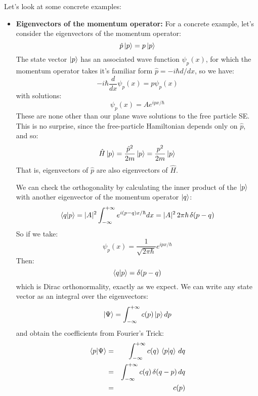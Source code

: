 \documentclass[12pt]{book}
\begin{document}
Let's look at some concrete examples:
\begin{itemize}
\item {\bf Eigenvectors of the momentum operator:}  For a concrete example, let's consider the eigenvectors of the momentum operator:
$$\hat{p} \ket{p} = p \ket{p}$$
The state vector $\ket{p}$ has an associated wave function $\psi_p(x)$, for which the momentum operator takes it's familiar form $\hat{p} = -i\hbar d/dx$, so we have:
$$-i\hbar \frac{d}{dx}\psi_p(x) = p \psi_p(x)$$
with solutions:
$$\psi_p(x) = A e^{\displaystyle ipx/\hbar}$$
These are none other than our plane wave solutions to the free particle SE.  This is no surprise, since the free-particle Hamiltonian depends only on $\hat{p}$, and so:
$$\hat{H} \ket{p} = \frac{\hat{p}^2}{2m} \ket{p} = \frac{p^2}{2m} \ket{p}$$
That is, eigenvectors of $\hat{p}$ are also eigenvectors of $\hat{H}$.

We can check the orthogonality by calculating the inner product of the $\ket{p}$ with another eigenvector of the momentum operator $\ket{q}$:
$$\braket{q|p} = |A|^2\int_{-\infty}^{+\infty} e^{i(p-q)x/\hbar} dx = |A|^2 \, 2\pi\hbar \, \delta(p-q)$$
So if we take:
$$\psi_p(x) = \frac{1}{\sqrt{2\pi \hbar}} e^{\displaystyle ipx/\hbar}$$
Then:
$$\braket{q|p} = \delta(p-q)$$
which is Dirac orthonormality, exactly as we expect.  We can write any state vector as an integral over the eigenvectors:
$$\ket{\Psi} = \int_{-\infty}^{+\infty} c(p) \ket{p} dp $$
and obtain the coefficients from Fourier's Trick:
\begin{eqnarray*}
\braket{p|\Psi} &=& \int_{-\infty}^{+\infty} c(q) \, \braket{p|q} \, dq \\
                &=& \int_{-\infty}^{+\infty} c(q) \, \delta(q-p) \, dq \\
				&=& c(p) \\
\end{eqnarray*}


\end{itemize}
\end{document}
